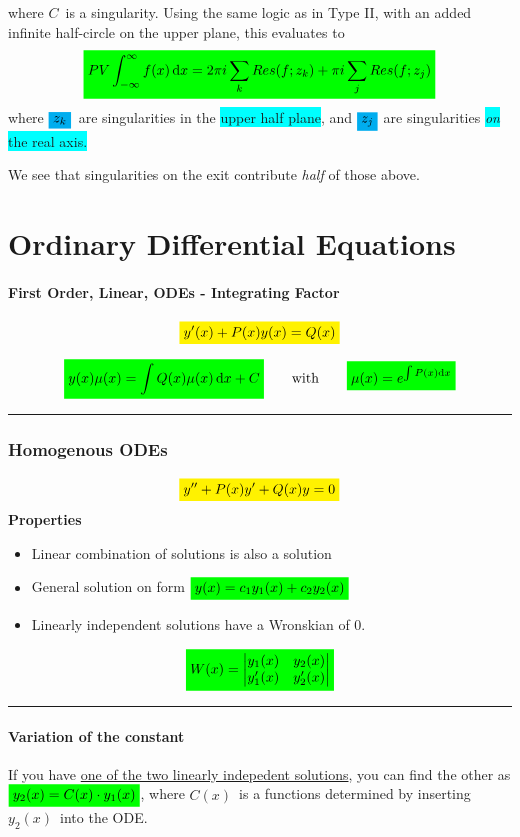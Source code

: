 \documentclass[10pt,a4paper]{article}
\renewcommand{\exp}{e^}
\newcommand{\infint}{\int_{-\infty}^{\infty}}
\newcommand{\holine}{\rule{286pt}{1pt}}
\newcommand{\Holine}{\rule{286pt}{3pt}}
\newcommand{\yl}[1]{\colorbox{yellow}{$\displaystyle #1$}}
\newcommand{\gr}[1]{\colorbox{green}{$\displaystyle #1$}}
\newcommand{\bl}[1]{\colorbox{cyan}{$\displaystyle #1$}}
\newcommand{\bll}{\colorbox{cyan}}
\begin{document}
\begin{multicols}{2}
where $C$ is a singularity. Using the same logic as in Type II, with an added infinite half-circle on the upper plane, this evaluates to
\[
\gr{
    PV\infint f(x) \dd{x} = 2\pi i \sum_k Res(f; z_k) + \pi i \sum_j Res(f;z_j)
}
\]
where $\bl{z_k}$ are singularities in the \bll{upper half plane}, and $\bl{z_j}$ are singularities \bll{\textit{on} the real axis.}

We see that singularities on the exit contribute \textit{half} of those above.




\newpage
\part*{Ordinary Differential Equations}

\subsection*{First Order, Linear, ODEs - Integrating Factor}
\[\yl{
    y'(x) + P(x) y(x) = Q(x)
}\]

\[\gr{
    y(x)\mu(x) = \int Q(x)\mu(x) \dd{x} + C} \quad\quad\text{with}\quad\quad \gr{\mu(x) = \exp{\int P(x)\dd{x}}
}\]




\Holine
\section*{Homogenous ODEs}
\[\yl{
    y'' + P(x)y' + Q(x)y = 0
}\]
\textbf{Properties}
\begin{itemize}
    \item Linear combination of solutions is also a solution
    \item General solution on form $\gr{y(x) = c_1 y_1(x) + c_2 y_2(x)}$
    \item Linearly independent solutions have a Wronskian of 0.
\end{itemize}
\[\gr{
    W(x) = 
    \begin{vmatrix} y_1(x) & y_2(x) \\ y_1'(x) & y_2'(x) \end{vmatrix}
}\]


\holine
\subsection*{Variation of the constant}
If you have \underline{one of the two linearly indepedent solutions}, you can find the other as $\gr{y_2(x) = C(x)\cdot y_1(x)}$, where $C(x)$ is a functions determined by inserting $y_2(x)$ into the ODE.


\end{multicols}
\end{document}
